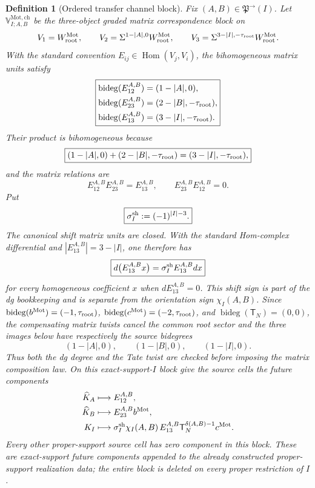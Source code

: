 \documentclass[11pt]{article}
\newtheorem{definition}[theorem]{Definition}
\theoremstyle{remark}
\newcommand{\bideg}{\operatorname{bideg}}
\newcommand{\Mot}{\mathrm{Mot}}
\newcommand{\rootc}{\mathrm{root}}
\begin{document}
\begin{definition}[Ordered transfer channel block]
\label{P2M-def:ordered-transfer-channel}
Fix $(A,B)\in\mathfrak P^{\to}(I)$.  Let
$\mathbb V_{I;A,B}^{\Mot,\mathrm{ch}}$ be the three-object graded matrix
correspondence block on
\[
 V_1=W_{\rootc}^{\Mot},\qquad
 V_2=\Sigma^{1-|A|,0}W_{\rootc}^{\Mot},\qquad
 V_3=\Sigma^{3-|I|,-\tau_{\rm root}}W_{\rootc}^{\Mot}.
\]
With the standard convention $E_{ij}\in\operatorname{Hom}(V_j,V_i)$, the
bihomogeneous matrix units satisfy
\begin{equation}
 \boxed{
 \begin{aligned}
 \bideg(E_{12}^{A,B})&=(1-|A|,0),\\
 \bideg(E_{23}^{A,B})&=(2-|B|,-\tau_{\rm root}),\\
 \bideg(E_{13}^{A,B})&=(3-|I|,-\tau_{\rm root}).
 \end{aligned}}
\end{equation}
Their product is bihomogeneous because
\begin{equation}
 \boxed{
 (1-|A|,0)+(2-|B|,-\tau_{\rm root})
 =(3-|I|,-\tau_{\rm root}),}
\end{equation}
and the matrix relations are
\[
 E_{12}^{A,B}E_{23}^{A,B}=E_{13}^{A,B},
 \qquad
 E_{23}^{A,B}E_{12}^{A,B}=0.
\]
Put
\begin{equation}\label{P2M-eq:channel-shift-sign}
 \boxed{\sigma_I^{\rm sh}:=(-1)^{|I|-3}.}
\end{equation}
The canonical shift matrix units are closed.  With the standard Hom-complex
differential and $|E_{13}^{A,B}|=3-|I|$, one therefore has
\begin{equation}\label{P2M-eq:channel-hom-leibniz}
 \boxed{
 d\bigl(E_{13}^{A,B}x\bigr)
 =\sigma_I^{\rm sh}E_{13}^{A,B}dx}
\end{equation}
for every homogeneous coefficient $x$ when $dE_{13}^{A,B}=0$.  This shift
sign is part of the dg bookkeeping and is separate from the orientation sign
$\chi_I(A,B)$.
Since \(\bideg(b^{\Mot})=(-1,\tau_{\rm root})\),
\(\bideg(c^{\Mot})=(-2,\tau_{\rm root})\), and
\(\bideg(\mathsf T_N)=(0,0)\), the compensating matrix twists cancel the
common root sector and the three images below have respectively the source
bidegrees
\[
 (1-|A|,0),\qquad(1-|B|,0),\qquad(1-|I|,0).
\]
Thus both the dg degree and the Tate twist are checked before imposing the
matrix composition law.  On this exact-support-$I$ block give the source
cells the future components
\begin{align}
 \widehat K_A
 &\longmapsto E_{12}^{A,B},
 \label{P2M-eq:channel-KA}\\
 \widehat K_B
 &\longmapsto E_{23}^{A,B}b^{\Mot},
 \label{P2M-eq:channel-KB}\\
 K_I
 &\longmapsto
   \sigma_I^{\rm sh}\chi_I(A,B)\,
   E_{13}^{A,B}\mathsf T_N^{\delta(A,B)-1}c^{\Mot}.
 \label{P2M-eq:channel-KI}
\end{align}
Every other proper-support source cell has zero component in this block.  These are exact-support future components appended to the already constructed proper-support realization data; the entire block is deleted on every proper restriction of $I$.


\end{definition}
\end{document}
